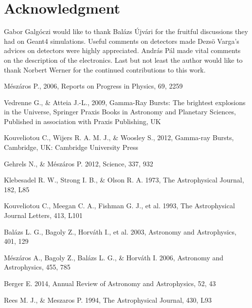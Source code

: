 \documentclass[12pt, a4paper,titlepage]{article}
\numberwithin{equation}{section}
\numberwithin{figure}{section}
\begin{document}
\pagebreak

\section{Acknowledgment}

Gabor Galg\'oczi would like to thank Bal\'azs \'Ujv\'ari for the fruitful discussions they had on Geant4 simulations. Useful comments on detectors made Dezs\"o Varga's advices on detectors were highly appreciated. András Pál made vital comments on the description of the electronics. Last but not least the author would like to thank Norbert Werner for the continued contributions to this work.

\pagebreak

\begin{thebibliography}{99}

 Mészáros P., 2006, Reports on Progress in Physics, 69, 2259

 Vedrenne G., \& Atteia J.-L., 2009, Gamma-Ray Bursts: The brightest explosions in the Universe,
Springer Praxis Books in Astronomy and Planetary Sciences, Published in association with Praxis
Publishing, UK

 Kouveliotou C., Wijers R. A. M. J., \& Woosley S., 2012, Gamma-ray Bursts, Cambridge, UK:
Cambridge University Press

 Gehrels N., \& Mészáros P. 2012, Science, 337, 932

 Klebesadel R. W., Strong I. B., \& Olson R. A. 1973, The Astrophysical Journal, 182, L85

 Kouveliotou C., Meegan C. A., Fishman G. J., et al. 1993, The Astrophysical Journal Letters, 413, L101

 Balázs L. G., Bagoly Z., Horváth I., et al. 2003, Astronomy and Astrophysics, 401, 129

 Mészáros A., Bagoly Z., Balázs L. G., \& Horváth I. 2006, Astronomy and Astrophysics, 455, 785

 Berger E. 2014, Annual Review of Astronomy and Astrophysics, 52, 43

 Rees M. J., \& Meszaros P. 1994, The Astrophysical Journal, 430, L93


\end{thebibliography}
\end{document}
